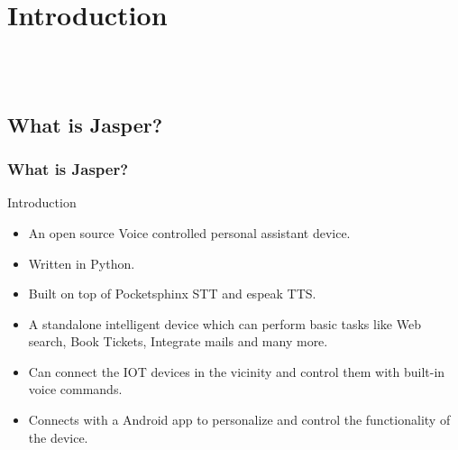 \documentclass[xcolor=dvipsnames]{beamer}
\begin{document}
\section{Introduction}
\begin{frame}
\begin{center}
\\
\vspace{0.5cm}
\\
\vspace{0.5cm}
\end{center}
\end{frame}


\subsection{What is Jasper?}
\begin{frame}[fragile] %
\frametitle{What is Jasper?}
\begin{exampleblock}{Introduction}
\begin{itemize}
\item An open source Voice controlled personal assistant device.
\item Written in Python.
\item Built on top of Pocketsphinx STT and espeak TTS.
\item A standalone intelligent device which can perform basic tasks like Web search, Book Tickets, Integrate mails and many more.
\item Can connect the IOT devices in the vicinity and control them with built-in  voice commands.
\item Connects with a Android app to personalize and control the functionality of the device.
\end{itemize}
\end{exampleblock}
\end{frame}
\end{document}
